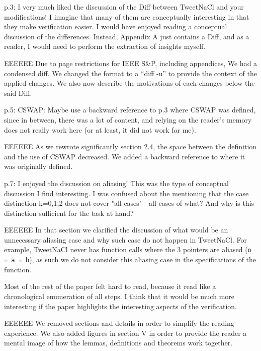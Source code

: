 p.3: I very much liked the discussion of the Diff between
TweetNaCl and your modifications! I imagine that many of
them are conceptually interesting in that they make verification
easier. I would have enjoyed reading a conceptual discussion
of the differences. Instead, Appendix A just contains a
Diff, and as a reader, I would need to perform the extraction
of insights myself.

\begin{answer}{EEEEEE}
Due to page restrictions for IEEE S\&P, including appendices,
We had a condensed diff. We changed the format to
a ``diff -u'' to provide the context of the applied changes. We
also now describe the motivations of each changes below
the said Diff.
\end{answer}

p.5: CSWAP: Maybe use a backward reference to p.3 where
CSWAP was defined, since in between, there was a lot of
content, and relying on the reader's memory does not really
work here (or at least, it did not work for me).

\begin{answer}{EEEEEE}
As we rewrote significantly section 2.4, the space between
the definition and the use of CSWAP decreased. We added a
backward reference to where it was originally defined.
\end{answer}

p.7: I enjoyed the discussion on aliasing! This was the type
of conceptual discussion I find interesting. I was confused
about the mentioning that the case distinction k=0,1,2 does
not cover "all cases" - all cases of what? And why is this
distinction sufficient for the task at hand?

\begin{answer}{EEEEEE}
In that section we clarified the discussion of what
would be an unnecessary aliasing case and why such case do
not happen in TweetNaCl. For example, TweetNaCl never
has function calls where the 3 pointers are aliased (\texttt{o = a = b}),
as such we do not consider this aliasing case in the
specifications of the function.
\end{answer}

Most of the rest of the paper felt hard to read, because it
read like a chronological enumeration of all steps. I think that
it would be much more interesting if the paper highlights the
interesting aspects of the verification.

\begin{answer}{EEEEEE}
We removed sections and details in order to simplify the
reading experience. We also added figures in section V in
order to provide the reader a mental image of how the lemmas,
definitions and theorems work together.
\end{answer}

